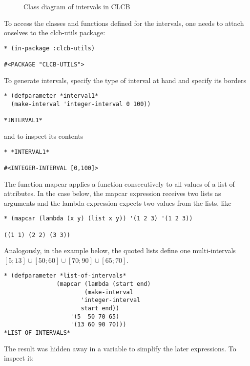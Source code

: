 \documentclass{book}
\newcommand\CLCB{CLCB }
\begin{document}
\begin{figure}
\begin{center}

\end{center}
\caption{Class diagram of intervals in \CLCB}
\end{figure}

To access the classes and functions defined for the intervals, one needs to attach onselves to the clcb-utils package:

\begin{lstlisting}
* (in-package :clcb-utils)

#<PACKAGE "CLCB-UTILS">
\end{lstlisting}


To generate intervals, specify the type of interval at hand and specify its borders
\begin{lstlisting}
* (defparameter *interval1*
  (make-interval 'integer-interval 0 100))

*INTERVAL1*
\end{lstlisting}

and to inspect its contents

\begin{lstlisting}
* *INTERVAL1*

#<INTEGER-INTERVAL [0,100]>
\end{lstlisting}

The function mapcar applies a function consecutively to all values of a list of attributes. 
In the case below, the mapcar expression receives two lists as arguments and the lambda
expression expects two values from the lists, like
\begin{lstlisting}
* (mapcar (lambda (x y) (list x y)) '(1 2 3) '(1 2 3))

((1 1) (2 2) (3 3))
\end{lstlisting}

Analogously, in the example below, the quoted lists define one multi-intervals $[5;13]\cup[50;60]\cup[70;90]\cup[65;70]$.

\begin{lstlisting}
* (defparameter *list-of-intervals*
               (mapcar (lambda (start end)
		               (make-interval
			          'integer-interval
			          start end))
	               '(5  50 70 65)
           	       '(13 60 90 70)))
*LIST-OF-INTERVALS*
\end{lstlisting}

The result was hidden away in a variable to simplify
the later expressions. To inspect it:
\end{document}
